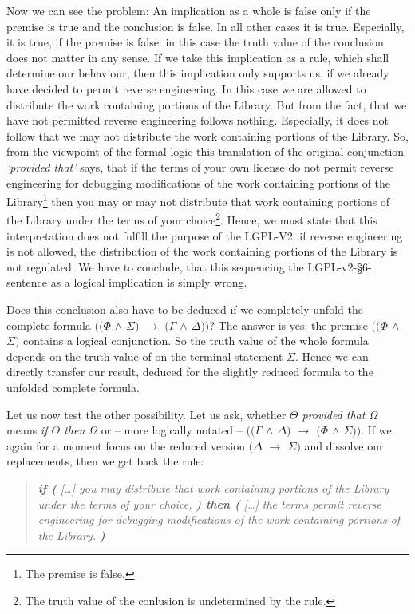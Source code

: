 Now we can see the problem: An implication as a whole is false only if the
premise is true and the conclusion is false. In all other cases it is true.
Especially, it is true, if the premise is false: in this case the truth value of
the conclusion does not matter in any sense. If we take this implication as a
rule, which shall determine our behaviour, then this implication only supports
us, if we already have decided to permit reverse engineering. In this case we
are allowed to distribute the work containing portions of the Library.
But from the fact, that we have not permitted reverse engineering follows
nothing. Especially, it does not follow that we may not distribute the work
containing portions of the Library. So, from the viewpoint of the formal logic
this translation of the original conjunction \emph{'provided that'} says, that
if the terms of your own license do not permit reverse engineering for debugging
modifications of the work containing portions of the Library\footnote{The
premise is false.} then you may or may not distribute that work containing
portions of the Library under the terms of your choice\footnote{The truth value
of the conlusion is undetermined by the rule.}. Hence, we must state that this
interpretation does not fulfill the purpose of the LGPL-V2: if reverse
engineering is not allowed, the distribution of the work containing portions of
the Library is not regulated. We have to conclude, that this sequencing the
LGPL-v2-§6-sentence as a logical implication is simply wrong.

Does this conclusion also have to be deduced if we completely unfold the
complete formula \emph{$((\Phi$ $\wedge$ $\Sigma)$ $\rightarrow$ $(\Gamma$
$\wedge$ $\Delta))$}? The answer is yes: the premise \emph{$((\Phi$ $\wedge$
$\Sigma)$} contains a logical conjunction. So the truth value of the whole
formula depends on the truth value of on the terminal statement $\Sigma$. Hence
we can directly transfer our result, deduced for the slightly reduced formula
to the unfolded complete formula.

Let us now test the other possibility. Let us ask, whether \emph{$\Theta$
provided that $\Omega$} means \emph{if $\Theta$ then $\Omega$} or -- more
logically notated -- \emph{$((\Gamma$ $\wedge$ $\Delta)$ $\rightarrow$ $(\Phi$
$\wedge$ $\Sigma))$}. If we again for a moment focus on the reduced version
\emph{$(\Delta$ $\rightarrow$ $\Sigma)$} and dissolve our replacements, then we
get back the rule:

\begin{quote}\noindent\emph{\textbf{if (} [\ldots] you may distribute that work
containing portions of the Library under the terms of your choice, \textbf{)
then (} [\ldots] the terms permit reverse engineering for debugging
modifications of the work containing portions of the Library.
\textbf{)}}\end{quote}


